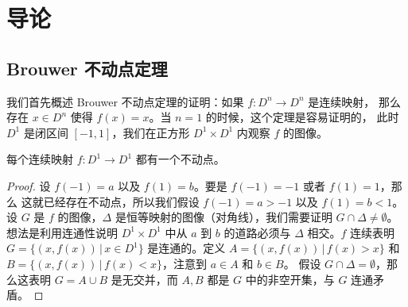 \documentclass[fontset=none]{Notes}
\begin{document}
\frontmatter

\tableofcontents

\mainmatter

\setcounter{chapter}{-1}

\chapter{导论}

\section{Brouwer 不动点定理}

我们首先概述 Brouwer 不动点定理的证明：如果 $f:D^n\to D^n$ 是连续映射，
那么存在 $x\in D^n$ 使得 $f(x)=x$。当 $n=1$ 的时候，这个定理是容易证明的，
此时 $D^1$ 是闭区间 $[-1,1]$，我们在正方形 $D^1\times D^1$ 内观察
$f$ 的图像。
\begin{figure}[h]
  \centering
\end{figure}

\begin{theorem}
  每个连续映射 $f:D^1\to D^1$ 都有一个不动点。
\end{theorem}
\begin{proof}
  设 $f(-1)=a$ 以及 $f(1)=b$。要是 $f(-1)=-1$ 或者 $f(1)=1$，那么
  这就已经存在不动点，所以我们假设 $f(-1)=a>-1$ 以及 $f(1)=b<1$。
  设 $G$ 是 $f$ 的图像，$\Delta$ 是恒等映射的图像（对角线），我们需要证明
  $G\cap\Delta\neq \emptyset$。想法是利用连通性说明 $D^1\times D^1$
  中从 $a$ 到 $b$ 的道路必须与 $\Delta$ 相交。$f$ 连续表明 
  $G=\{(x,f(x))\,|\, x\in D^1\}$ 是连通的。定义 $A=\{(x,f(x))\,|\, f(x)>x\}$
  和 $B=\{(x,f(x))\,|\, f(x)<x\}$，注意到 $a\in A$ 和 $b\in B$。
  假设 $G\cap \Delta=\emptyset$，那么这表明 $G=A\cup B$ 是无交并，而
  $A,B$ 都是 $G$ 中的非空开集，与 $G$ 连通矛盾。
\end{proof}
\end{document}

